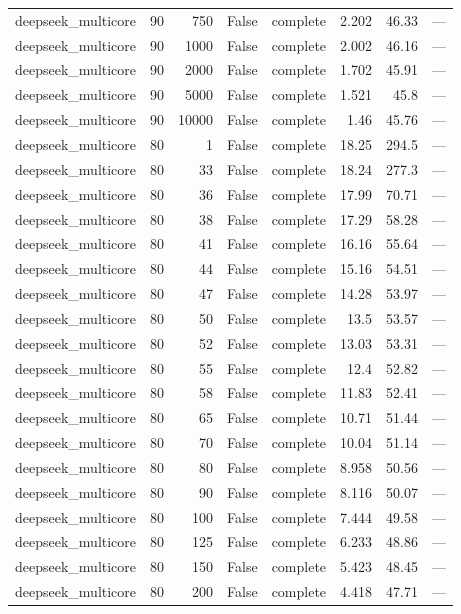 \begin{tabular}{lrrrlrrl}
deepseek\_multicore & 90 & 750 & False & complete & 2.202 & 46.33 & — \\
deepseek\_multicore & 90 & 1000 & False & complete & 2.002 & 46.16 & — \\
deepseek\_multicore & 90 & 2000 & False & complete & 1.702 & 45.91 & — \\
deepseek\_multicore & 90 & 5000 & False & complete & 1.521 & 45.8 & — \\
deepseek\_multicore & 90 & 10000 & False & complete & 1.46 & 45.76 & — \\
deepseek\_multicore & 80 & 1 & False & complete & 18.25 & 294.5 & — \\
deepseek\_multicore & 80 & 33 & False & complete & 18.24 & 277.3 & — \\
deepseek\_multicore & 80 & 36 & False & complete & 17.99 & 70.71 & — \\
deepseek\_multicore & 80 & 38 & False & complete & 17.29 & 58.28 & — \\
deepseek\_multicore & 80 & 41 & False & complete & 16.16 & 55.64 & — \\
deepseek\_multicore & 80 & 44 & False & complete & 15.16 & 54.51 & — \\
deepseek\_multicore & 80 & 47 & False & complete & 14.28 & 53.97 & — \\
deepseek\_multicore & 80 & 50 & False & complete & 13.5 & 53.57 & — \\
deepseek\_multicore & 80 & 52 & False & complete & 13.03 & 53.31 & — \\
deepseek\_multicore & 80 & 55 & False & complete & 12.4 & 52.82 & — \\
deepseek\_multicore & 80 & 58 & False & complete & 11.83 & 52.41 & — \\
deepseek\_multicore & 80 & 65 & False & complete & 10.71 & 51.44 & — \\
deepseek\_multicore & 80 & 70 & False & complete & 10.04 & 51.14 & — \\
deepseek\_multicore & 80 & 80 & False & complete & 8.958 & 50.56 & — \\
deepseek\_multicore & 80 & 90 & False & complete & 8.116 & 50.07 & — \\
deepseek\_multicore & 80 & 100 & False & complete & 7.444 & 49.58 & — \\
deepseek\_multicore & 80 & 125 & False & complete & 6.233 & 48.86 & — \\
deepseek\_multicore & 80 & 150 & False & complete & 5.423 & 48.45 & — \\
deepseek\_multicore & 80 & 200 & False & complete & 4.418 & 47.71 & — \\

\end{tabular}
